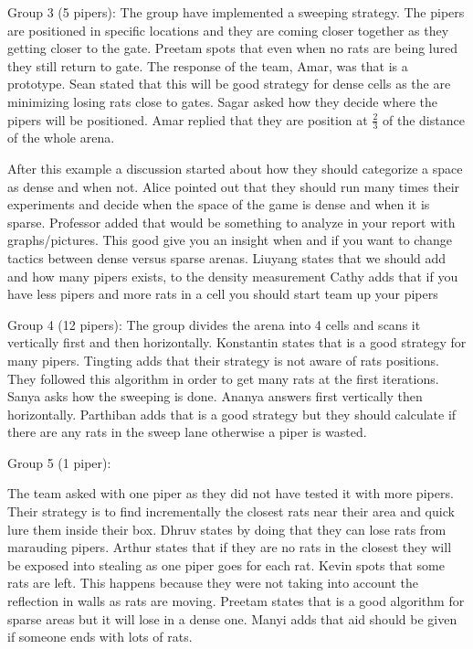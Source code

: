 Group 3 (5 pipers):
The group have implemented a sweeping strategy. The pipers are positioned in specific locations and they are coming closer together as they getting closer to the gate.
Preetam spots that even when no rats are being lured they still return to gate.
The response of the team, Amar, was that is a prototype.
Sean stated that this will be good strategy for dense cells as the are minimizing losing rats close to gates.
Sagar asked how they decide where the pipers will be positioned.
Amar replied that they are position at $\frac{2}{3}$ of the distance of the whole arena.

After this example a discussion started about how they should categorize a space as dense and when not.
Alice pointed out that they should run many times their experiments and decide when the space of the game is dense and when it is sparse. 
Professor added that would be something to analyze in your report with graphs/pictures. This good give you an insight when and if you want to change tactics between dense versus sparse arenas.
Liuyang states that we should add and how many pipers exists, to the density measurement 
Cathy adds that if you have less pipers and more rats in a cell you should start team up your pipers


Group 4 (12 pipers):
The group divides the arena into 4 cells and scans it vertically first and then horizontally.
Konstantin states that is a good strategy for many pipers.
Tingting adds that their strategy is not aware of rats positions. They followed this algorithm in order to get many rats at the first iterations.
Sanya asks how the sweeping is done.
Ananya answers first vertically then horizontally.
Parthiban adds that is a good strategy but they should calculate if there are any rats in the sweep lane otherwise a piper is wasted.

Group 5 (1 piper):

The team asked with one piper as they did not have tested it with more pipers.
Their strategy is to find incrementally the closest rats near their area and quick lure them inside their box.
Dhruv states by doing that they can lose rats from marauding pipers.
Arthur states that if they are no rats in the closest they will be exposed into stealing as one piper goes for each rat.
Kevin spots that some rats are left. This happens because they were not taking into account the reflection in walls as rats are moving.
Preetam states that is a good algorithm for sparse areas but it will lose in a dense one.
Manyi adds that aid should be given if someone ends with lots of rats.

